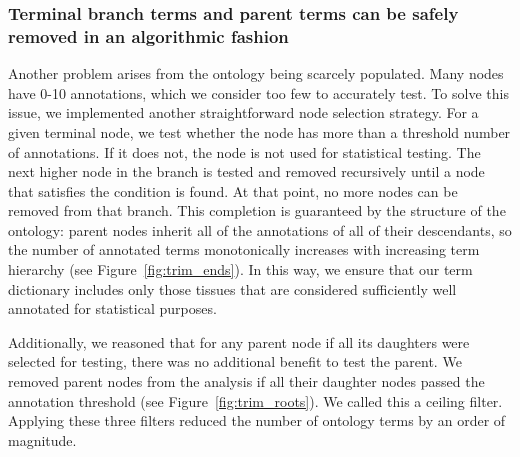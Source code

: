 \subsubsection*{Terminal branch terms and parent terms can be
safely removed in an algorithmic fashion }
Another problem arises from the ontology being scarcely populated. Many nodes
have 0-10 annotations, which we consider too few to accurately test. To solve
this issue, we implemented another straightforward node selection strategy. For
a given terminal node, we test whether the node has more than a threshold number
of annotations. If it does not, the node is not used for statistical testing.
The next higher node in the branch is tested and removed recursively until a
node that satisfies the condition is found. At that point, no more nodes can be
removed from that branch. This completion is guaranteed by the structure of the
ontology: parent nodes inherit all of the annotations of all of their
descendants, so the number of annotated terms monotonically increases with
increasing term hierarchy (see Figure~\ref{fig:trim_ends}). In this way, we
ensure that our term dictionary includes only those tissues that are considered
sufficiently well annotated for statistical purposes.

Additionally, we reasoned that for any parent node if all its daughters were
selected for testing, there was no additional benefit to test the parent. We
removed parent nodes from the analysis if all their daughter nodes passed the
annotation threshold (see Figure~\ref{fig:trim_roots}). We called this a ceiling
filter. Applying these three filters reduced the number of ontology terms by an
order of magnitude.

